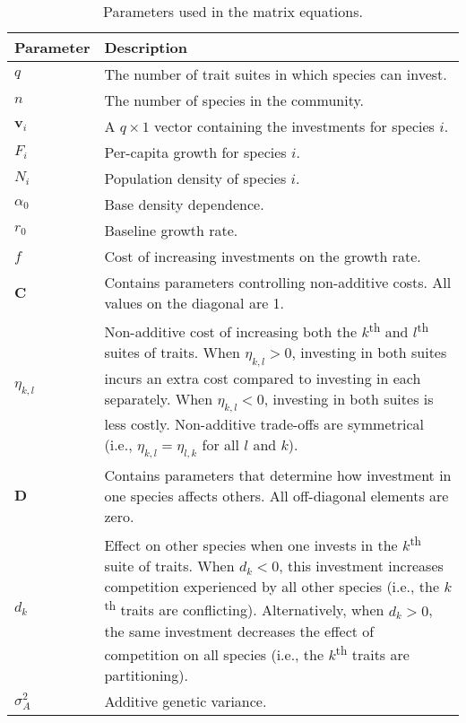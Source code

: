 \begin{table}[!ht]
    \centering
    \singlespacing
    \renewcommand{\arraystretch}{1.5}
    \begin{tabular}{lp{5in}}
    \toprule
    Parameter & Description \\
    \midrule
    $q$ & The number of trait suites in which species can invest. \\
    $n$ & The number of species in the community. \\
    $\mathbf{v}_i$ & A $q \times 1$ vector containing the  investments for
        species $i$. \\
    $F_i$ & Per-capita growth for species $i$. \\
    $N_i$ & Population density of species $i$. \\
    $\alpha_0$ & Base density dependence. \\
    $r_0$ & Baseline growth rate. \\
    $f$ & Cost of increasing investments on the growth rate. \\
    $\mathbf{C}$ & Contains parameters controlling non-additive costs.
        All values on the diagonal are 1. \\
    $\eta_{k,l}$ & Non-additive cost of increasing both the
        $k$\textsuperscript{th} and $l$\textsuperscript{th} suites of traits.
        When $\eta_{k,l} > 0$, investing in both suites incurs an extra cost
        compared to investing in each separately.
        When $\eta_{k,l} < 0$, investing in both suites is less costly.
        Non-additive trade-offs are symmetrical (i.e., $\eta_{k,l} = \eta_{l,k}$
        for all $l$ and $k$). \\
    $\mathbf{D}$ & Contains parameters that determine how investment in one
        species affects others. All off-diagonal elements are zero. \\
    $d_k$ & Effect on other species when one invests in the
        $k$\textsuperscript{th} suite of traits. 
        When $d_k < 0$, this investment increases competition experienced by 
        all other species (i.e., the $k$\textsuperscript{th} traits 
        are conflicting). 
        Alternatively, when $d_k > 0$, the same investment decreases the 
        effect of competition on all species (i.e., the $k$\textsuperscript{th}
        traits are partitioning). \\
    $\sigma_A^2$ & Additive genetic variance. \\
    \bottomrule
    \end{tabular}
    \caption{Parameters used in the matrix equations.}
    \label{tab:matrix-parameters-table}
\end{table}


